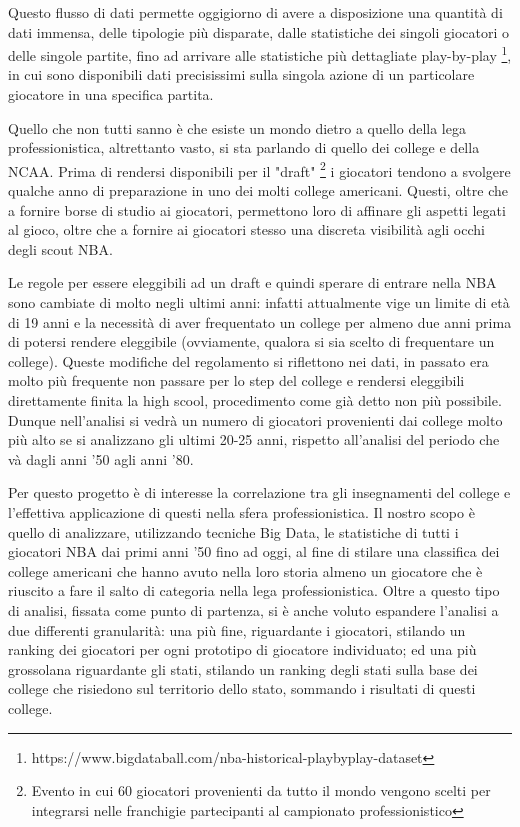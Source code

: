 \documentclass[10.5pt,a4paper,twocolumn]{article}
\begin{document}
Questo flusso di dati permette oggigiorno di avere a disposizione una quantità di dati immensa, delle tipologie più disparate, dalle statistiche dei singoli giocatori o delle singole partite, fino ad arrivare alle statistiche più dettagliate play-by-play \footnote{https://www.bigdataball.com/nba-historical-playbyplay-dataset}, in cui sono disponibili dati precisissimi sulla singola azione di un particolare giocatore in una specifica partita.

Quello che non tutti sanno è che esiste un mondo dietro a quello della lega professionistica, altrettanto vasto, si sta parlando di quello dei college e della NCAA. Prima di rendersi disponibili per il "draft" \footnote{Evento in cui 60 giocatori provenienti da tutto il mondo vengono scelti per integrarsi nelle franchigie partecipanti al campionato professionistico} i giocatori tendono a svolgere qualche anno di preparazione in uno dei molti college americani. Questi, oltre che a fornire borse di studio ai giocatori, permettono loro di affinare gli aspetti legati al gioco, oltre che a fornire ai giocatori stesso una discreta visibilità agli occhi degli scout NBA. 

Le regole per essere eleggibili ad un draft e quindi sperare di entrare nella NBA sono cambiate di molto negli ultimi anni: infatti attualmente vige un limite di età di 19 anni e la necessità di aver frequentato un college per almeno due anni prima di potersi rendere eleggibile (ovviamente, qualora si sia scelto di frequentare un college). Queste modifiche del regolamento si riflettono nei dati, in passato era molto più frequente non passare per lo step del college e rendersi eleggibili direttamente finita la high scool, procedimento come già detto non più possibile. Dunque nell'analisi si vedrà un numero di giocatori provenienti dai college molto più alto se si analizzano gli ultimi 20-25 anni, rispetto all'analisi del periodo che và dagli anni '50 agli anni '80.

Per questo progetto è di interesse la correlazione tra gli insegnamenti del college e l'effettiva applicazione di questi nella sfera professionistica. Il nostro scopo è quello di analizzare, utilizzando tecniche Big Data, le statistiche di tutti i giocatori NBA dai primi anni '50 fino ad oggi, al fine di stilare una classifica dei college americani che hanno avuto nella loro storia almeno un giocatore che è riuscito a fare il salto di categoria nella lega professionistica. Oltre a questo tipo di analisi, fissata come punto di partenza, si è anche voluto espandere l'analisi a due differenti granularità: una più fine, riguardante i giocatori, stilando un ranking dei giocatori per ogni prototipo di giocatore individuato; ed una più grossolana riguardante gli stati, stilando un ranking degli stati sulla base dei college che risiedono sul territorio dello stato, sommando i risultati di questi college. 
\end{document}

